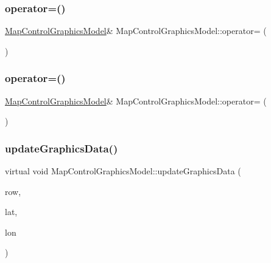 \subsubsection{\texorpdfstring{operator=()}{operator=()}\hspace{0.1cm}{\footnotesize\ttfamily [1/2]}}
{\footnotesize\ttfamily \mbox{\hyperlink{class_map_control_graphics_model}{Map\+Control\+Graphics\+Model}}\& Map\+Control\+Graphics\+Model\+::operator= (\begin{DoxyParamCaption}\item[{const \mbox{\hyperlink{class_map_control_graphics_model}{Map\+Control\+Graphics\+Model}} \&}]{ }\end{DoxyParamCaption})\hspace{0.3cm}{\ttfamily [default]}}

\mbox{\label{class_map_control_graphics_model_af5786286f5f3e888f5a4ada3eb1547bf}} 
\subsubsection{\texorpdfstring{operator=()}{operator=()}\hspace{0.1cm}{\footnotesize\ttfamily [2/2]}}
{\footnotesize\ttfamily \mbox{\hyperlink{class_map_control_graphics_model}{Map\+Control\+Graphics\+Model}}\& Map\+Control\+Graphics\+Model\+::operator= (\begin{DoxyParamCaption}\item[{\mbox{\hyperlink{class_map_control_graphics_model}{Map\+Control\+Graphics\+Model}} \&\&}]{ }\end{DoxyParamCaption})\hspace{0.3cm}{\ttfamily [default]}}

\mbox{\label{class_map_control_graphics_model_ae5a590579987d471211cf59c61b1b54c}} 
\subsubsection{\texorpdfstring{updateGraphicsData()}{updateGraphicsData()}}
{\footnotesize\ttfamily virtual void Map\+Control\+Graphics\+Model\+::update\+Graphics\+Data (\begin{DoxyParamCaption}\item[{int}]{row,  }\item[{float}]{lat,  }\item[{float}]{lon }\end{DoxyParamCaption})\hspace{0.3cm}{\ttfamily [pure virtual]}}



